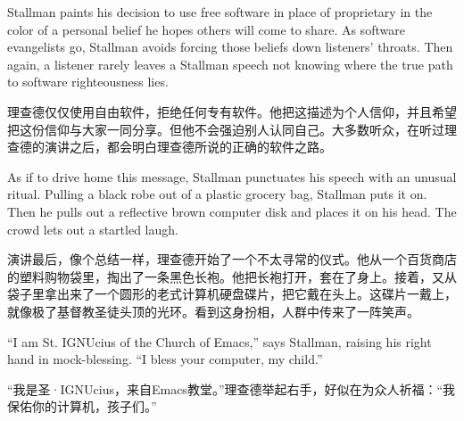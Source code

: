 \ifdefined\eng
Stallman paints his decision to use free software in place of proprietary in the color of a personal belief he hopes others will come to share. As software evangelists go, Stallman avoids forcing those beliefs down listeners' throats. Then again, a listener rarely leaves a Stallman speech not knowing where the true path to software righteousness lies.
\fi

\ifdefined\chs
理查德仅仅使用自由软件，拒绝任何专有软件。他把这描述为个人信仰，并且希望把这份信仰与大家一同分享。但他不会强迫别人认同自己。大多数听众，在听过理查德的演讲之后，都会明白理查德所说的正确的软件之路。
\fi

\ifdefined\eng
As if to drive home this message, Stallman punctuates his speech with an unusual ritual. Pulling a black robe out of a plastic grocery bag, Stallman puts it on.  Then he pulls out a reflective brown computer disk and places it on his head. The crowd lets out a startled laugh.
\fi

\ifdefined\chs
演讲最后，像个总结一样，理查德开始了一个不太寻常的仪式。他从一个百货商店的塑料购物袋里，掏出了一条黑色长袍。他把长袍打开，套在了身上。接着，又从袋子里拿出来了一个圆形的老式计算机硬盘碟片，把它戴在头上。这碟片一戴上，就像极了基督教圣徒头顶的光环。看到这身扮相，人群中传来了一阵笑声。
\fi

\ifdefined\eng
``I am St. IGNUcius of the Church of Emacs,'' says Stallman, raising his right hand in mock-blessing. ``I bless your computer, my child.''
\fi

\ifdefined\chs
``我是圣·IGNUcius，来自Emacs教堂。''理查德举起右手，好似在为众人祈福：``我保佑你的计算机，孩子们。''
\fi

